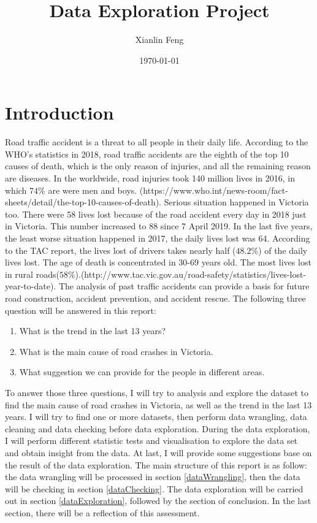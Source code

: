 \documentclass[11pt]{article}
\title{Data	Exploration Project}
\author{Xianlin Feng}
\date{\today}
\theoremstyle{definition}
\begin{document}
\maketitle

\section{Introduction}
\label{Introduction}
Road traffic accident is a threat to all people in their daily life. According to the WHO's statistics in 2018, road traffic accidents are the eighth of the top 10 causes of death, which is the only reason of injuries, and all the remaining reason are diseases. In the worldwide, road injuries took 140 million lives in 2016, in which $74\%$ are were men and boys. (https://www.who.int/news-room/fact-sheets/detail/the-top-10-causes-of-death). Serious situation happened in Victoria too. There were 58 lives lost because of the road accident every day in 2018 just in Victoria. This number increased to 88 since 7 April 2019. In the last five years, the least worse situation happened in 2017, the daily lives lost was 64.  According to the TAC report, the lives lost of drivers takes nearly half ($48.2\%$) of the daily lives lost. The age of death is concentrated in 30-69 years old. The most lives lost in rural roads($58\%$).(http://www.tac.vic.gov.au/road-safety/statistics/lives-lost-year-to-date). The analysis of past traffic accidents can provide a basis for future road construction, accident prevention, and accident rescue. The following three question will be answered in this report:
\begin{enumerate}
	\item What is the trend in the last 13 years?
	\item What is the main cause of road crashes in Victoria.
	\item What suggestion we can provide for the people in different areas.
\end{enumerate}
To answer those three questions, I will try to analysis and explore the dataset to find the main cause of road crashes in Victoria, as well as the trend in the last 13 years. I will try to find one or more datasets, then perform data wrangling, data cleaning and data checking before data exploration. During the data exploration, I will perform different statistic tests and visualisation to explore the data set and obtain insight from the data. At last, I will provide some suggestions base on the result of the data exploration. The main structure of this report is as follow: the data wrangling will be processed in section \ref{dataWrangling}, then the data will be checking in section \ref{dataChecking}. The data exploration will be carried out in section \ref{dataExploration}, followed by the section of conclusion. In the last section, there will be a reflection of this assessment. 
\par
\end{document}
